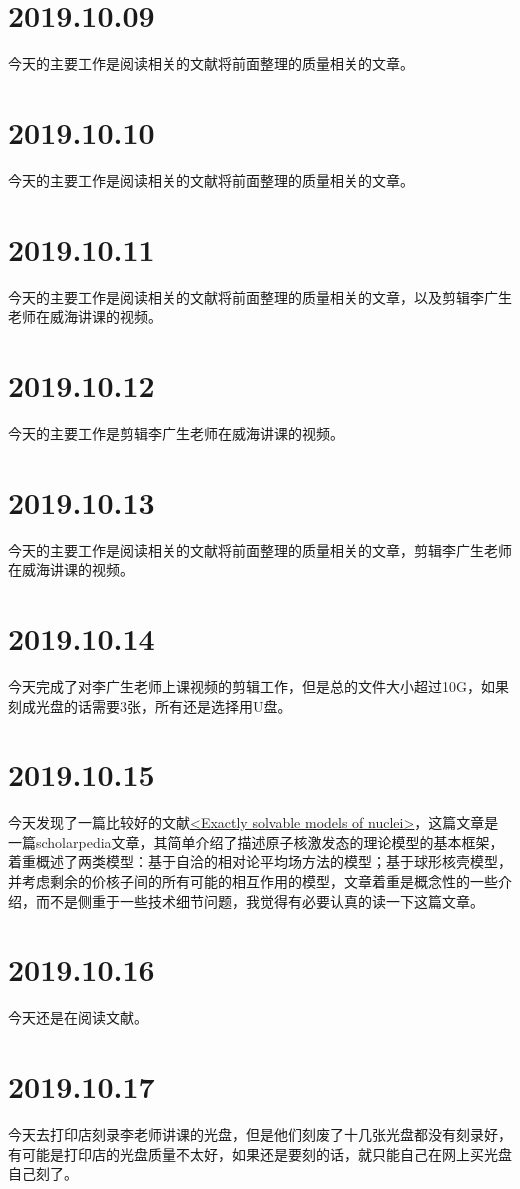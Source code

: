 \section{2019.10.09}
今天的主要工作是阅读相关的文献将前面整理的质量相关的文章。

\section{2019.10.10}
今天的主要工作是阅读相关的文献将前面整理的质量相关的文章。

\section{2019.10.11}
今天的主要工作是阅读相关的文献将前面整理的质量相关的文章，以及剪辑李广生老师在威海讲课的视频。

\section{2019.10.12}
今天的主要工作是剪辑李广生老师在威海讲课的视频。

\section{2019.10.13}
今天的主要工作是阅读相关的文献将前面整理的质量相关的文章，剪辑李广生老师在威海讲课的视频。

\section{2019.10.14}
今天完成了对李广生老师上课视频的剪辑工作，但是总的文件大小超过10G，如果刻成光盘的话需要3张，所有还是选择用U盘。

\section{2019.10.15}
今天发现了一篇比较好的文献\href{https://www.doi.org/10.4249/scholarpedia.31279}{<Exactly solvable models of nuclei>}\cite{RN1176}，这篇文章是一篇scholarpedia文章，其简单介绍了描述原子核激发态的理论模型的基本框架，着重概述了两类模型：基于自洽的相对论平均场方法的模型；基于球形核壳模型，并考虑剩余的价核子间的所有可能的相互作用的模型，文章着重是概念性的一些介绍，而不是侧重于一些技术细节问题，我觉得有必要认真的读一下这篇文章。

\section{2019.10.16}
今天还是在阅读文献\cite{RN1176}。

\section{2019.10.17}
今天去打印店刻录李老师讲课的光盘，但是他们刻废了十几张光盘都没有刻录好，有可能是打印店的光盘质量不太好，如果还是要刻的话，就只能自己在网上买光盘自己刻了。